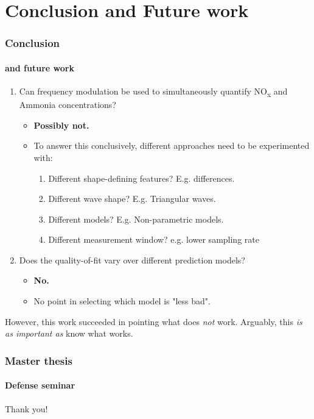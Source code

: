 \documentclass{beamer}
\newcommand{\nox}{\texorpdfstring{NO\textsubscript{x}}{NOx}\xspace}
\begin{document}
\section{Conclusion and Future work}
\begin{frame}
	\frametitle{Conclusion}
	\framesubtitle{and future work}
	
	\begin{enumerate}
		\item Can frequency modulation be used to simultaneously quantify \nox and Ammonia concentrations?
		\begin{itemize}
			\item \textbf{Possibly not.}
			\item To answer this conclusively, different approaches need to be experimented with:
			\begin{enumerate}
				\item Different shape-defining features? E.g. differences.
				\item Different wave shape? E.g. Triangular waves.
				\item Different models? E.g. Non-parametric models.
				\item Different measurement window? e.g. lower sampling rate				
				\end{enumerate}
			\end{itemize}
	
		
		\item Does the quality-of-fit vary over different prediction models?
		\begin{itemize}
			\item \textbf{No.}
			\item No point in selecting which model is "less bad".
		\end{itemize}
	\end{enumerate}

However, this work succeeded in pointing what does \textit{not} work. Arguably, this \textit{is as important as} know what works.

\end{frame}

\begin{frame}
	\frametitle{Master thesis}
	\framesubtitle{Defense seminar}
	\centering
	\Huge Thank you!
\end{frame}
\end{document}
